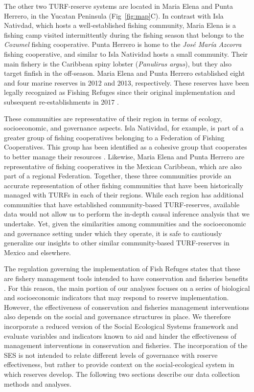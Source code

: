 \documentclass[10pt,letterpaper]{article}
\begin{document}
The other two TURF-reserve systems are located in Maria Elena and Punta Herrero, in the Yucatan Peninsula (Fig~\ref{fig:map}C). In contrast with Isla Nativdad, which hosts a well-established fishing community, Maria Elena is a fishing camp visited intermittently during the fishing season that belongs to the \emph{Cozumel} fishing cooperative. Punta Herrero is home to the \emph{José María Azcorra} fishing cooperative, and similar to Isla Natividad hosts a small community. Their main fishery is the Caribbean spiny lobster (\emph{Panulirus argus}), but they also target finfish in the off-season. Maria Elena and Punta Herrero established eight and four marine reserves in 2012 and 2013, respectively. These reserves have been legally recognized as Fishing Refuges since their original implementation \cite{dof_website_2012,dof_website_2013} and subsequent re-establishments in 2017 \cite{dof_website_2017b}.

These communities are representative of their region in terms of ecology, socioeconomic, and governance aspects. Isla Natividad, for example, is part of a greater group of fishing cooperatives belonging to a Federation of Fishing Cooperatives. This group has been identified as a cohesive group that cooperates to better manage their resources \cite{mccay_2014,mccay_2017,acevesbueno_2017}. Likewise, Maria Elena and Punta Herrero are representative of fishing cooperatives in the Mexican Caribbean, which are also part of a regional Federation. Together, these three communities provide an accurate representation of other fishing communities that have been historically managed with TURFs in each of their regions. While each region has additional communities that have established community-based TURF-reserves, available data would not allow us to perform the in-depth causal inference analysis that we undertake. Yet, given the similarities among communities and the socioeconomic and governance setting under which they operate, it is safe to cautiously generalize our insights to other similar community-based TURF-reserves in Mexico and elsewhere.

The regulation governing the implementation of Fish Refuges states that these are fishery management tools intended to have conservation and fisheries benefits \cite{nom}. For this reason, the main portion of our analyses focuses on a series of biological and socioeconomic indicators that may respond to reserve implementation. However, the effectiveness of conservation and fisheries management interventions also depends on the social and governance structures in place. We therefore incorporate a reduced version of the Social Ecological Systems framework \cite{ostrom_2009} and evaluate variables and indicators known to aid and hinder the effectiveness of management interventions in conservation and fisheries. The incorporation of the SES is not intended to relate different levels of governance with reserve effectiveness, but rather to provide context on the social-ecological system in which reserves develop. The following two sections describe our data collection methods and analyses.
\end{document}
